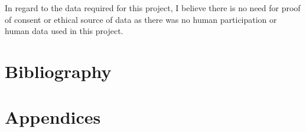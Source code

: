 \documentclass{article}
\begin{document}
    	In regard to the data required for this project, I believe there is no need for proof of consent or ethical source of data as there was no human participation or human data used in this project.

    \section{Bibliography}

    
    

    \section{Appendices}
\end{document}
